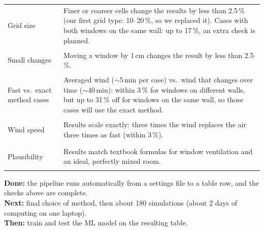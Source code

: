 \documentclass[10pt,a4paper]{article}
\newcommand{\head}[1]{\par\medskip{\large\bfseries #1}\par\smallskip}
\begin{document}
\renewcommand{\arraystretch}{1.2}
\begin{tabularx}{\textwidth}{@{}>{\bfseries\raggedright\arraybackslash}p{3.4cm}>{\raggedright\arraybackslash}X@{}}
\toprule
Grid size & Finer or coarser cells change the results by less than 2.5\,\% (our first grid type: 10--20\,\%, so we replaced it). Cases with both windows on the same wall: up to 17\,\%, an extra check is planned. \\
Small changes & Moving a window by 1\,cm changes the result by less than 2.5\,\%. \\
Fast vs.\ exact method\newline\mdseries 12 cases & Averaged wind (${\sim}$5\,min per case) vs.\ wind that changes over time (${\sim}$40\,min): within 3\,\% for windows on different walls, but up to 31\,\% off for windows on the same wall, so those cases will use the exact method. \\
Wind speed & Results scale exactly: three times the wind replaces the air three times as fast (within 3\,\%). \\
Plausibility & Results match textbook formulas for window ventilation and an ideal, perfectly mixed room. \\
\bottomrule
\end{tabularx}

\head{Where we are}
\textbf{Done:} the pipeline runs automatically from a settings file to a table row, and the checks above are complete.\\
\textbf{Next:} final choice of method, then about 180 simulations (about 2 days of computing on one laptop).\\
\textbf{Then:} train and test the ML model on the resulting table.
\end{document}
